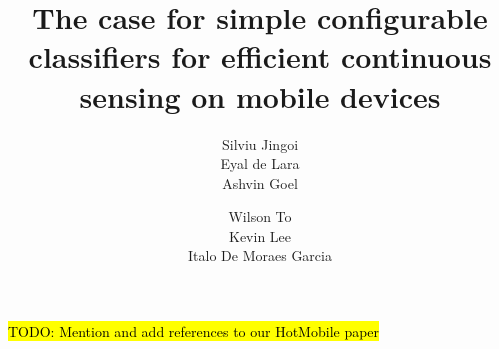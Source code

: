 \documentclass[letterpaper,twocolumn]{acm_proc_article-sp}
\begin{document}
\date{}


\title{The case for simple configurable classifiers for efficient continuous sensing on mobile devices}


\author{
\alignauthor Silviu Jingoi\\
\alignauthor Eyal de Lara\\
\alignauthor Ashvin Goel\\
\and
\alignauthor Wilson To\\
\alignauthor Kevin Lee\\
\alignauthor Italo De Moraes Garcia\\
}

\maketitle

\hl{TODO: Mention and add references to our HotMobile paper}













\end{document}
